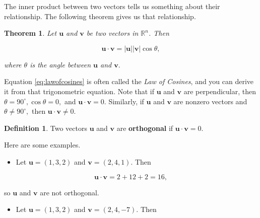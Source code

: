 \documentclass[
]{book}
\providecommand{\tightlist}{%
  \setlength{\itemsep}{0pt}\setlength{\parskip}{0pt}}
\newtheorem{theorem}{Theorem}[chapter]
\theoremstyle{definition}
\newtheorem{definition}{Definition}[chapter]
\theoremstyle{definition}
\theoremstyle{definition}
\theoremstyle{definition}
\theoremstyle{remark}
\begin{document}
The inner product between two vectors tells us something about their relationship. The following theorem gives us that relationship.

\begin{theorembox}

\begin{theorem}
Let \(\mathbf{u}\) and \(\mathbf{v}\) be two vectors in \(\mathbb{R}^n\). Then

\begin{equation}
\mathbf{u}\cdot\mathbf{v}=|\mathbf{u}||\mathbf{v}|\cos\theta,
\label{eq:lawofcosines}
\end{equation}

where \(\theta\) is the angle between \(\mathbf{u}\) and \(\mathbf{v}.\)
\end{theorem}

\end{theorembox}

Equation \eqref{eq:lawofcosines} is often called the \emph{Law of Cosines}, and you can derive it from that trigonometric equation. Note that if \(\mathbf{u}\) and \(\mathbf{v}\) are perpendicular, then \(\theta=90^\circ, \cos\theta=0,\) and \(\mathbf{u}\cdot \mathbf{v}=0.\) Similarly, if \(\mathbf{u}\) and \(\mathbf{v}\) are nonzero vectors and \(\theta\neq 90^\circ,\) then \(\mathbf{u}\cdot \mathbf{v}\neq 0\).

\begin{defbox}

\begin{definition}
Two vectors \(\mathbf{u}\) and \(\mathbf{v}\) are \textbf{orthogonal} if \(\mathbf{u}\cdot\mathbf{v}=0.\)
\end{definition}

\end{defbox}

Here are some examples.

\begin{itemize}
\tightlist
\item
  Let \(\mathbf{u}=(1,3,2)\) and \(\mathbf{v}=(2,4,1)\). Then
\end{itemize}

\[\mathbf{u}\cdot \mathbf{v}=2+12+2=16,\]

so \(\mathbf{u}\) and \(\mathbf{v}\) are not orthogonal.

\begin{itemize}
\tightlist
\item
  Let \(\mathbf{u}=(1,3,2)\) and \(\mathbf{v}=(2,4,-7)\). Then
\end{itemize}
\end{document}
